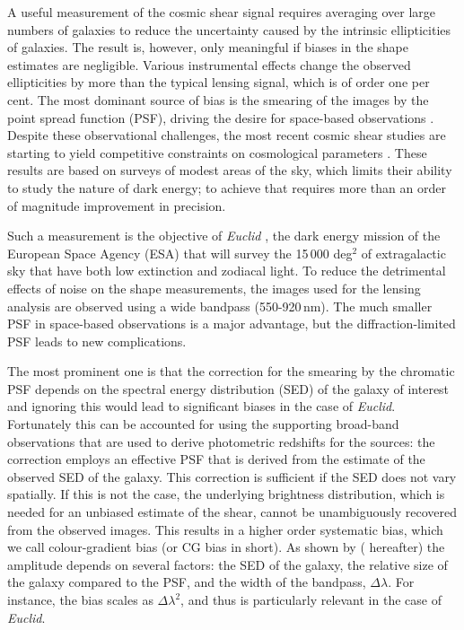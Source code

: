 \documentclass[useAMS,usenatbib]{mnras}
\begin{document}
A useful measurement of the cosmic shear signal requires averaging over large numbers of galaxies
to reduce the uncertainty caused by the intrinsic ellipticities of galaxies. The result is, however, only meaningful if biases in the shape estimates are negligible. Various instrumental effects change the observed ellipticities by more than the typical lensing signal, which is of order one per cent. The most dominant source of bias is the smearing of the images by the point spread function (PSF), driving the desire for space-based observations \citep{Paulin-Henriksson08, Massey13}.
Despite these observational challenges, the most recent cosmic shear studies are starting to yield competitive constraints on cosmological parameters \citep{Heymans13, Jarvis16,Jee16,Hildebrandt17}. These results are based on surveys of modest areas of the sky, which limits their ability to study the nature of dark energy; to achieve that requires more than an order of magnitude improvement in precision.

Such a measurement is the objective of {\it Euclid} \citep{Laureijs11}, the dark energy mission of the European Space Agency (ESA) that will survey the 15\,000 deg$^2$ of extragalactic sky that have both low extinction and zodiacal light. To reduce the detrimental effects of noise on the shape measurements, the images used for the lensing analysis are observed using a wide bandpass (550-920\,nm). The much smaller PSF in space-based observations
is a major advantage, but the diffraction-limited PSF leads to new complications.

The most prominent one is that the correction for the smearing by the chromatic PSF depends on the spectral energy distribution (SED) of the galaxy of interest \citep{Cypriano10, Eriksen17} and ignoring this would lead to significant biases in the case of {\it Euclid}. Fortunately this can be accounted for using the supporting broad-band observations that are used to derive photometric redshifts for the sources: the correction employs an effective PSF that is derived from the estimate of the observed SED of the galaxy. This correction is sufficient if the SED does not vary spatially. If this is not the case, the underlying brightness distribution, which is needed for an unbiased estimate of the shear, cannot be unambiguously recovered from the observed images.
This results in a higher order systematic bias, which we call colour-gradient bias (or CG bias in short).
As shown by \cite{Semboloni13} ( hereafter) the amplitude depends on several factors: the SED of the galaxy, the relative size of the galaxy compared to the PSF, and the width of the bandpass, $\Delta\lambda$.  For instance, the bias scales as $\Delta\lambda^2$, and thus is particularly relevant in the case of {\it Euclid}.
\end{document}
